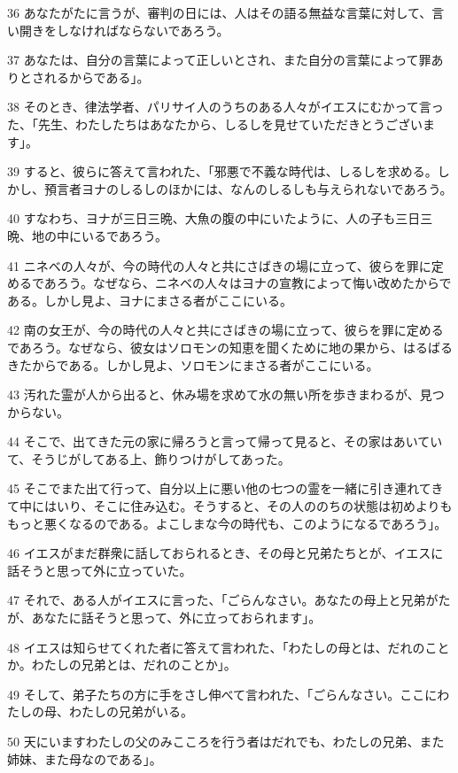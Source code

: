 \par 36 あなたがたに言うが、審判の日には、人はその語る無益な言葉に対して、言い開きをしなければならないであろう。
\par 37 あなたは、自分の言葉によって正しいとされ、また自分の言葉によって罪ありとされるからである」。
\par 38 そのとき、律法学者、パリサイ人のうちのある人々がイエスにむかって言った、「先生、わたしたちはあなたから、しるしを見せていただきとうございます」。
\par 39 すると、彼らに答えて言われた、「邪悪で不義な時代は、しるしを求める。しかし、預言者ヨナのしるしのほかには、なんのしるしも与えられないであろう。
\par 40 すなわち、ヨナが三日三晩、大魚の腹の中にいたように、人の子も三日三晩、地の中にいるであろう。
\par 41 ニネベの人々が、今の時代の人々と共にさばきの場に立って、彼らを罪に定めるであろう。なぜなら、ニネベの人々はヨナの宣教によって悔い改めたからである。しかし見よ、ヨナにまさる者がここにいる。
\par 42 南の女王が、今の時代の人々と共にさばきの場に立って、彼らを罪に定めるであろう。なぜなら、彼女はソロモンの知恵を聞くために地の果から、はるばるきたからである。しかし見よ、ソロモンにまさる者がここにいる。
\par 43 汚れた霊が人から出ると、休み場を求めて水の無い所を歩きまわるが、見つからない。
\par 44 そこで、出てきた元の家に帰ろうと言って帰って見ると、その家はあいていて、そうじがしてある上、飾りつけがしてあった。
\par 45 そこでまた出て行って、自分以上に悪い他の七つの霊を一緒に引き連れてきて中にはいり、そこに住み込む。そうすると、その人ののちの状態は初めよりももっと悪くなるのである。よこしまな今の時代も、このようになるであろう」。
\par 46 イエスがまだ群衆に話しておられるとき、その母と兄弟たちとが、イエスに話そうと思って外に立っていた。
\par 47 それで、ある人がイエスに言った、「ごらんなさい。あなたの母上と兄弟がたが、あなたに話そうと思って、外に立っておられます」。
\par 48 イエスは知らせてくれた者に答えて言われた、「わたしの母とは、だれのことか。わたしの兄弟とは、だれのことか」。
\par 49 そして、弟子たちの方に手をさし伸べて言われた、「ごらんなさい。ここにわたしの母、わたしの兄弟がいる。
\par 50 天にいますわたしの父のみこころを行う者はだれでも、わたしの兄弟、また姉妹、また母なのである」。

